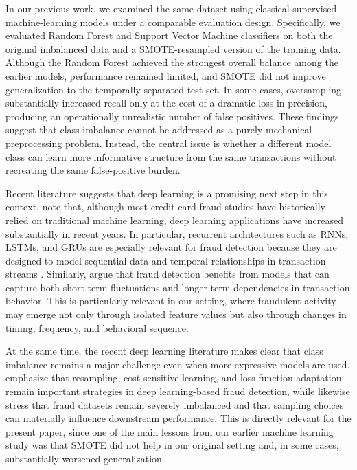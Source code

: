 \documentclass[oneside,12pt,parskip=half,american,numbers=noenddot]{scrreprt}
\begin{document}
In our previous work, we examined the same dataset using classical supervised machine-learning models under a comparable evaluation design. Specifically, we evaluated Random Forest and Support Vector Machine classifiers on both the original imbalanced data and a SMOTE-resampled version of the training data. Although the Random Forest achieved the strongest overall balance among the earlier models, performance remained limited, and SMOTE did not improve generalization to the temporally separated test set. In some cases, oversampling substantially increased recall only at the cost of a dramatic loss in precision, producing an operationally unrealistic number of false positives. These findings suggest that class imbalance cannot be addressed as a purely mechanical preprocessing problem. Instead, the central issue is whether a different model class can learn more informative structure from the same transactions without recreating the same false-positive burden.

Recent literature suggests that deep learning is a promising next step in this context. \textcite{mienye_deep_2024} note that, although most credit card fraud studies have historically relied on traditional machine learning, deep learning applications have increased substantially in recent years. In particular, recurrent architectures such as RNNs, LSTMs, and GRUs are especially relevant for fraud detection because they are designed to model sequential data and temporal relationships in transaction streams \parencite{mienye_deep_2024}. Similarly, \textcite{zhou_deep_2025} argue that fraud detection benefits from models that can capture both short-term fluctuations and longer-term dependencies in transaction behavior. This is particularly relevant in our setting, where fraudulent activity may emerge not only through isolated feature values but also through changes in timing, frequency, and behavioral sequence.

At the same time, the recent deep learning literature makes clear that class imbalance remains a major challenge even when more expressive models are used. \textcite{mienye_deep_2024} emphasize that resampling, cost-sensitive learning, and loss-function adaptation remain important strategies in deep learning-based fraud detection, while \textcite{sekhar_nama_credit_2026} likewise stress that fraud datasets remain severely imbalanced and that sampling choices can materially influence downstream performance. This is directly relevant for the present paper, since one of the main lessons from our earlier machine learning study was that SMOTE did not help in our original setting and, in some cases, substantially worsened generalization.
\end{document}
